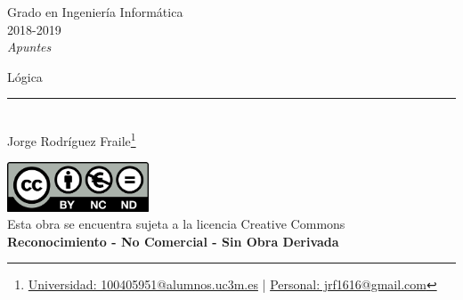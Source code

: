 \documentclass[12pt]{report} %
\begin{document}
	
\begin{titlepage}
	\begin{sffamily}
	\color{azulUC3M}
	\begin{center}
		\begin{figure}[H] %
		\end{figure}
		\vspace{2.5cm}
		\begin{Large}
			Grado en Ingeniería Informática\\			
			2018-2019\\
			\vspace{2cm}		
			\textsl{Apuntes}\\
			\bigskip
		\end{Large}
		 	{\Huge Lógica}\\
		 	\vspace*{0.5cm}
	 		\rule{10.5cm}{0.1mm}\\
			\vspace*{0.9cm}
			{\LARGE Jorge Rodríguez Fraile\footnote{\href{mailto:100405951@alumnos.uc3m.es}{Universidad: 100405951@alumnos.uc3m.es}  |  \href{mailto:jrf1616@gmail.com}{Personal: jrf1616@gmail.com}}}\\ 
			\vspace*{1cm}
	\end{center}
	\vfill
	\color{black}
		\includegraphics[width=4.2cm]{img/creativecommons.png}\\
		Esta obra se encuentra sujeta a la licencia Creative Commons\\ \textbf{Reconocimiento - No Comercial - Sin Obra Derivada}
	\end{sffamily}
\end{titlepage}


\tableofcontents
\thispagestyle{fancy}
\end{document}
